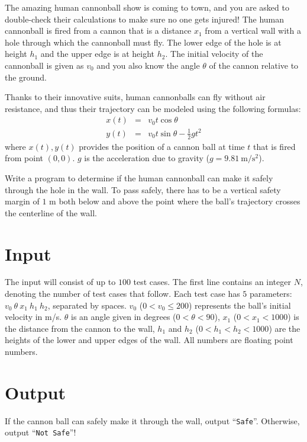 

The amazing human cannonball show is coming to town, and you are asked to double-check
their calculations to make sure no one gets injured!
The human cannonball is fired from a cannon that is a distance $x_1$ from a vertical
wall with a hole through which the cannonball must fly.  The lower edge of the hole is
at height $h_1$ and the upper edge is at height $h_2$.  The initial velocity of
the cannonball is given as $v_0$ and you also know the angle $\theta$ of the cannon
relative to the ground.

Thanks to their innovative suits, human cannonballs can fly without air resistance,
and thus their trajectory can be modeled using the following formulas:
\begin{eqnarray*}
    x(t) & = & v_0 t \cos{\theta} \\
    y(t) & = & v_0 t \sin{\theta} - \frac{1}{2} g t^2
\end{eqnarray*}
where $x(t), y(t)$ provides the position of a cannon ball at time $t$ that is fired
from point $(0, 0)$. $g$ is the acceleration due to gravity ($g = 9.81\ \text{m}/\text{s}^2$).

Write a program to determine if the human cannonball can make it safely through
the hole in the wall.  To pass safely, there has to be a vertical safety margin
of $1$ m both below and above the point where the ball's trajectory crosses the
centerline of the wall.

\section*{Input}

The input will consist of up to $100$ test cases.  The first line contains an
integer $N$, denoting the number of test cases that follow.
Each test case has $5$ parameters: $v_0 \ \theta \ x_1 \ h_1 \ h_2$, separated by spaces.
$v_0$ ($0 < v_0 \le 200$)
represents the ball's initial velocity in m/s.
$\theta$ is an angle given in degrees ($0 < \theta < 90$),
$x_1$ ($0 < x_1 < 1000$) is the distance from the cannon to the
wall, $h_1$ and $h_2$ ($0 < h_1 < h_2 < 1000$)
are the heights of the lower and upper edges of the wall.
All numbers are floating point numbers.

\section*{Output}

If the cannon ball can safely make it through the wall, output
``\texttt{Safe}''.  Otherwise, output ``\texttt{Not Safe}''!
